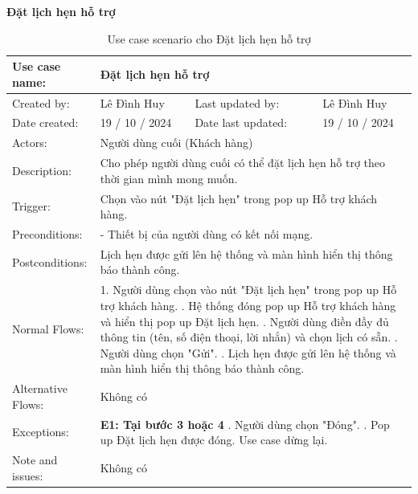 \textbf{Đặt lịch hẹn hỗ trợ}
\begin{table}[H]
    \centering
    \begin{tabular}{|l|l|l|l|} 
        \hline
        Use case name: & \multicolumn{3}{|l|}{Đặt lịch hẹn hỗ trợ} \\
        \hline
        Created by: & Lê Đình Huy & Last updated by: & Lê Đình Huy \\
        \hline
        Date created: & 19 / 10 / 2024 & Date last updated: & 19 / 10 / 2024 \\
        \hline
        Actors: & \multicolumn{3}{|l|}{Người dùng cuối (Khách hàng)} \\
        \hline
        Description: & \multicolumn{3}{|p{12cm}|}{Cho phép người dùng cuối có thể đặt lịch hẹn hỗ trợ theo thời gian mình mong muốn.} \\ 
        \hline
        Trigger: & \multicolumn{3}{|p{12cm}|}{Chọn vào nút "Đặt lịch hẹn" trong pop up Hỗ trợ khách hàng.} \\
        \hline
        Preconditions: & \multicolumn{3}{|p{12cm}|}{- Thiết bị của người dùng có kết nối mạng.} \\
        \hline
        Postconditions: & \multicolumn{3}{|p{12cm}|}{Lịch hẹn được gửi lên hệ thống và màn hình hiển thị thông báo thành công.} \\
        \hline
        Normal Flows: & \multicolumn{3}{|p{12cm}|}{1. Người dùng chọn vào nút "Đặt lịch hẹn" trong pop up Hỗ trợ khách hàng. \newline
        2. Hệ thống đóng pop up Hỗ trợ khách hàng và hiển thị pop up Đặt lịch hẹn. \newline
        3. Người dùng điền đầy đủ thông tin (tên, số điện thoại, lời nhắn) và chọn lịch có sẵn. \newline
        4. Người dùng chọn "Gửi". \newline
        5. Lịch hẹn được gửi lên hệ thống và màn hình hiển thị thông báo thành công.} \\
        \hline
        Alternative Flows: & \multicolumn{3}{|p{12cm}|}{Không có} \\
        \hline
        Exceptions: & \multicolumn{3}{|p{12cm}|}{\textbf{E1: Tại bước 3 hoặc 4} \newline
        3.1. Người dùng chọn "Đóng". \newline
        3.2. Pop up Đặt lịch hẹn được đóng. \newline
        Use case dừng lại.} \\
        \hline
        Note and issues: & \multicolumn{3}{|p{12cm}|}{Không có} \\
        \hline
    \end{tabular}
    \caption{Use case scenario cho Đặt lịch hẹn hỗ trợ}
\end{table}

